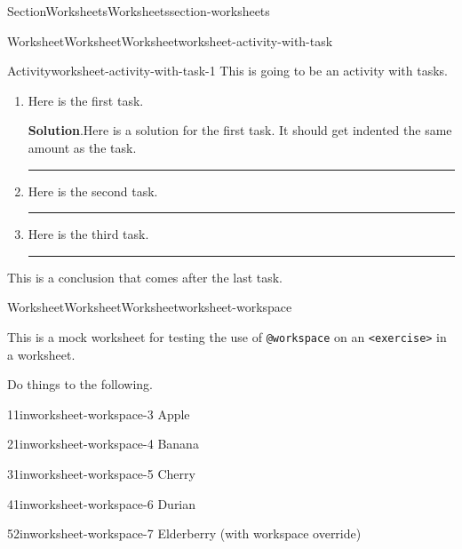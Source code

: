 \documentclass[oneside,10pt,]{article}
\newcommand{\blocktitlefont}{\relax}
\newcommand{\ptxmono}[1]{\texttt{#1}}
\newlength{\ptxworkspacestrutwidth}
\numberwithin{equation}{section}
\begin{document}
\begin{sectionptx}{Section}{Worksheets}{}{Worksheets}{}{}{section-worksheets}
\begin{worksheet-subsection}{Worksheet}{Worksheet}{}{Worksheet}{}{}{worksheet-activity-with-task}
\begin{activity}{Activity}{}{worksheet-activity-with-task-1}
This is going to be an activity with tasks.%
\begin{enumerate}[font=\bfseries,label=(\alph*),ref=\alph*]%
\item{}Here is the first task.%
\par\smallskip%
\noindent\textbf{\blocktitlefont Solution}.\hypertarget{worksheet-activity-with-task-1-2-2}{}\quad{}Here is a solution for the first task.  It should get indented the same amount as the task.%
\par\rule{\ptxworkspacestrutwidth}{0.75in}%
\item{}Here is the second task.%
\par\rule{\ptxworkspacestrutwidth}{0.25in}%
\item{}Here is the third task.%
\par\rule{\ptxworkspacestrutwidth}{1.75in}%
\end{enumerate}%
This is a conclusion that comes after the last task.%
\end{activity}%
\end{worksheet-subsection}
\restoregeometry
%
%
\typeout{************************************************}
\typeout{************************************************}
%
\begin{worksheet-subsection}{Worksheet}{Worksheet}{}{Worksheet}{}{}{worksheet-workspace}
\begin{introduction}{}%
This is a mock worksheet for testing the use of \ptxmono{@workspace} on an \ptxmono{<exercise>} in a worksheet.%
\end{introduction}%
Do things to the following.%
\begin{divisionexercise}{1}{}{1in}{worksheet-workspace-3}%
Apple%
\end{divisionexercise}%
\begin{divisionexercise}{2}{}{1in}{worksheet-workspace-4}%
Banana%
\end{divisionexercise}%
\begin{divisionexercise}{3}{}{1in}{worksheet-workspace-5}%
Cherry%
\end{divisionexercise}%
\begin{divisionexercise}{4}{}{1in}{worksheet-workspace-6}%
Durian%
\end{divisionexercise}%
\begin{divisionexercise}{5}{}{2in}{worksheet-workspace-7}%
Elderberry (with workspace override)%
\end{divisionexercise}%

\end{worksheet-subsection}
\end{sectionptx}
\end{document}
